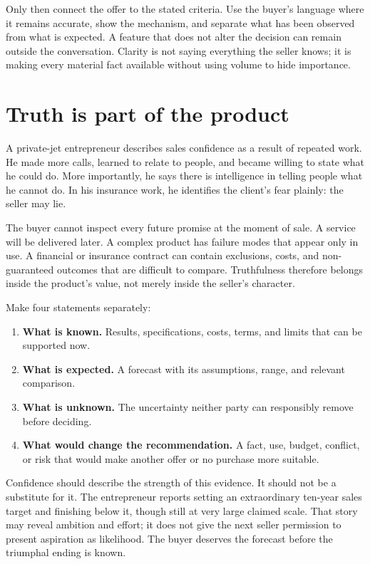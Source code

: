 Only then connect the offer to the stated criteria. Use the buyer's language
where it remains accurate, show the mechanism, and separate what has been
observed from what is expected. A feature that does not alter the decision can
remain outside the conversation. Clarity is not saying everything the seller
knows; it is making every material fact available without using volume to hide
importance.

\section{Truth is part of the product}

A private-jet entrepreneur describes sales confidence as a result of repeated
work. He made more calls, learned to relate to people, and became willing to
state what he could do. More importantly, he says there is intelligence in
telling people what he cannot do. In his insurance work, he identifies the
client's fear plainly: the seller may lie.

The buyer cannot inspect every future promise at the moment of sale. A service
will be delivered later. A complex product has failure modes that appear only
in use. A financial or insurance contract can contain exclusions, costs, and
non-guaranteed outcomes that are difficult to compare. Truthfulness therefore
belongs inside the product's value, not merely inside the seller's character.

Make four statements separately:

\begin{enumerate}[itemsep=0.15em]
\item \textbf{What is known.} Results, specifications, costs, terms, and limits
  that can be supported now.
\item \textbf{What is expected.} A forecast with its assumptions, range, and
  relevant comparison.
\item \textbf{What is unknown.} The uncertainty neither party can responsibly
  remove before deciding.
\item \textbf{What would change the recommendation.} A fact, use, budget,
  conflict, or risk that would make another offer or no purchase more suitable.
\end{enumerate}

Confidence should describe the strength of this evidence. It should not be a
substitute for it. The entrepreneur reports setting an extraordinary ten-year
sales target and finishing below it, though still at very large claimed scale.
That story may reveal ambition and effort; it does not give the next seller
permission to present aspiration as likelihood. The buyer deserves the
forecast before the triumphal ending is known.

